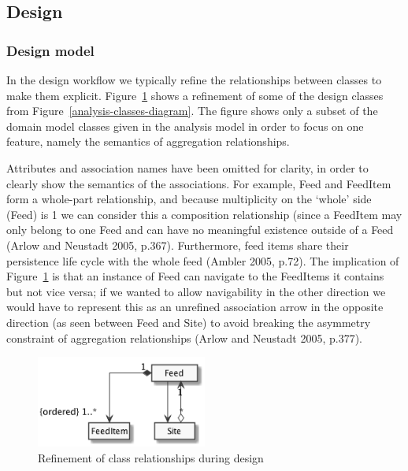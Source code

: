 \documentclass[a4paper]{article}
\begin{document}
\subsection{Design}

\subsubsection{Design model}

In the design workflow we typically refine the relationships between classes to make them explicit. Figure~\ref{design-classes-diagram} shows a refinement of some of the design classes from Figure~\ref{analysis-classes-diagram}. The figure shows only a subset of the domain model classes given in the analysis model in order to focus on one feature, namely the semantics of aggregation relationships.

Attributes and association names have been omitted for clarity, in order to clearly show the semantics of the associations. For example, \textsf{Feed} and \textsf{FeedItem} form a whole-part relationship, and because multiplicity on the `whole' side (\textsf{Feed}) is 1 we can consider this a composition relationship (since a \textsf{FeedItem} may only belong to one \textsf{Feed} and can have no meaningful existence outside of a \textsf{Feed} (Arlow and Neustadt 2005, p.367). Furthermore, feed items share their persistence life cycle with the whole feed (Ambler 2005, p.72). The implication of Figure~\ref{design-classes-diagram} is that an instance of \textsf{Feed} can navigate to the \textsf{FeedItem}s it contains but not vice versa; if we wanted to allow navigability in the other direction we would have to represent this as an unrefined association arrow in the opposite direction (as seen between \textsf{Feed} and \textsf{Site}) to avoid breaking the asymmetry constraint of aggregation relationships (Arlow and Neustadt 2005, p.377).

\begin{figure}
  \begin{center}
    \includegraphics[width=0.5\textwidth]{design-classes.png}
  \end{center}
  \caption{Refinement of class relationships during design}
  \label{design-classes-diagram}
\end{figure}
\end{document}
